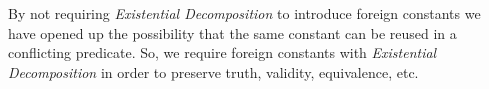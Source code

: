 \documentclass[12pt,letterpaper]{article}
\begin{document}
\begin{enumerate}
      By not requiring \textit{Existential Decomposition} to introduce foreign constants
      we have opened up the possibility that the same constant can be reused in a conflicting predicate.
      So, we require foreign constants with \textit{Existential Decomposition}
      in order to preserve truth, validity, equivalence, etc.
  \end{enumerate}
\end{document}
